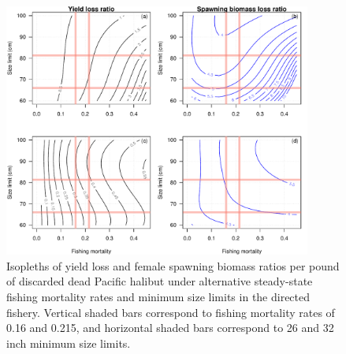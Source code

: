 \documentclass[12pt]{article}
\begin{document}
\begin{figure}[htbp]
	\centering
		\includegraphics[width=0.9\textwidth]{fig:Halitosis:SlowGrowth.pdf}
	\caption{Isopleths of yield loss and female spawning biomass ratios per pound of discarded dead Pacific halibut under alternative steady-state fishing mortality rates and minimum size limits in the directed fishery.  Vertical shaded bars correspond to fishing mortality rates of 0.16 and 0.215, and horizontal shaded bars correspond to 26 and 32 inch minimum size limits.}
	\label{fig:fig:Halitosis:SlowGrowth}
\end{figure}




\end{document}
